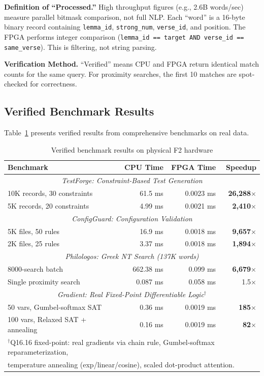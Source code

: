 \documentclass[11pt,a4paper]{article}
\begin{document}
\textbf{Definition of ``Processed.''}
High throughput figures (e.g., 2.6B words/sec) measure parallel bitmask
comparison, not full NLP. Each ``word'' is a 16-byte binary record containing
\texttt{lemma\_id}, \texttt{strong\_num}, \texttt{verse\_id}, and position.
The FPGA performs integer comparison (\texttt{lemma\_id == target AND
verse\_id == same\_verse}). This is filtering, not string parsing.

\textbf{Verification Method.}
``Verified'' means CPU and FPGA return identical match counts for the same
query. For proximity searches, the first 10 matches are spot-checked for
correctness.

\subsection{Verified Benchmark Results}
\label{subsec:verified_benchmarks_chirho}

Table~\ref{tab:verified_results_chirho} presents verified results from
comprehensive benchmarks on real data.

\begin{table}[ht]
\centering
\caption{Verified benchmark results on physical F2 hardware}
\label{tab:verified_results_chirho}
\begin{tabular}{lrrr}
\toprule
\textbf{Benchmark} & \textbf{CPU Time} & \textbf{FPGA Time} & \textbf{Speedup} \\
\midrule
\multicolumn{4}{c}{\textit{TestForge: Constraint-Based Test Generation}} \\
10K records, 30 constraints & 61.5 ms & 0.0023 ms & \textbf{26,288$\times$} \\
5K records, 20 constraints & 4.99 ms & 0.0021 ms & \textbf{2,410$\times$} \\
\midrule
\multicolumn{4}{c}{\textit{ConfigGuard: Configuration Validation}} \\
5K files, 50 rules & 16.9 ms & 0.0018 ms & \textbf{9,657$\times$} \\
2K files, 25 rules & 3.37 ms & 0.0018 ms & \textbf{1,894$\times$} \\
\midrule
\multicolumn{4}{c}{\textit{Philologos: Greek NT Search (137K words)}} \\
8000-search batch & 662.38 ms & 0.099 ms & \textbf{6,679$\times$} \\
Single proximity search & 0.087 ms & 0.058 ms & 1.5$\times$ \\
\midrule
\multicolumn{4}{c}{\textit{Gradient: Real Fixed-Point Differentiable Logic$^\dagger$}} \\
50 vars, Gumbel-softmax SAT & 0.36 ms & 0.0019 ms & \textbf{185$\times$} \\
100 vars, Relaxed SAT + annealing & 0.16 ms & 0.0019 ms & \textbf{82$\times$} \\
\bottomrule
\multicolumn{4}{l}{\footnotesize $^\dagger$Q16.16 fixed-point: real gradients via chain rule, Gumbel-softmax reparameterization,} \\
\multicolumn{4}{l}{\footnotesize temperature annealing (exp/linear/cosine), scaled dot-product attention.}
\end{tabular}
\end{table}
\end{document}
